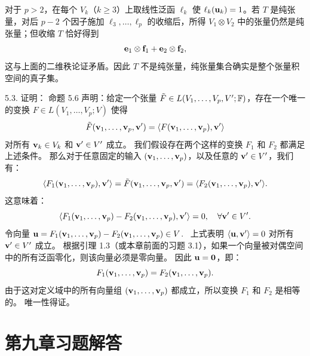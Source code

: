 \begin{exer}
对于 $p>2$，在每个 $V_k$（$k\ge3$）上取线性泛函 $\ell_k$ 使 $\ell_k(\mathbf{u}_k)=1$。若 $T$ 是纯张量，对后 $p-2$ 个因子施加 $\ell_3,\dots,\ell_p$ 的收缩后，所得 $V_1\otimes V_2$ 中的张量仍然是纯张量；但收缩 $T$ 恰好得到
$$\mathbf{e}_1\otimes\mathbf{f}_1+\mathbf{e}_2\otimes\mathbf{f}_2,$$
这与上面的二维秩论证矛盾。因此 $T$ 不是纯张量，纯张量集合确实是整个张量积空间的真子集。

5.3. 证明：
命题 5.6 声明：给定一个张量 $\tilde{F} \in L(V_1, \dots, V_p, V'; \mathbb{F})$，存在一个唯一的变换 $F \in L(V_1, \dots, V_p; V)$ 使得
$$ \tilde{F}(\mathbf{v}_1, \dots, \mathbf{v}_p, \mathbf{v}') = \langle F(\mathbf{v}_1, \dots, \mathbf{v}_p), \mathbf{v}' \rangle $$
对所有 $\mathbf{v}_k \in V_k$ 和 $\mathbf{v}' \in V'$ 成立。
我们假设存在两个这样的变换 $F_1$ 和 $F_2$ 都满足上述条件。
那么对于任意固定的输入 $(\mathbf{v}_1, \dots, \mathbf{v}_p)$，以及任意的 $\mathbf{v}' \in V'$，我们有：
$$ \langle F_1(\mathbf{v}_1, \dots, \mathbf{v}_p), \mathbf{v}' \rangle = \tilde{F}(\mathbf{v}_1, \dots, \mathbf{v}_p, \mathbf{v}') = \langle F_2(\mathbf{v}_1, \dots, \mathbf{v}_p), \mathbf{v}' \rangle. $$
这意味着：
$$ \langle F_1(\mathbf{v}_1, \dots, \mathbf{v}_p) - F_2(\mathbf{v}_1, \dots, \mathbf{v}_p), \mathbf{v}' \rangle = 0, \quad \forall \mathbf{v}' \in V'. $$
令向量 $\mathbf{u} = F_1(\mathbf{v}_1, \dots, \mathbf{v}_p) - F_2(\mathbf{v}_1, \dots, \mathbf{v}_p) \in V$.~
上式表明 $\langle \mathbf{u}, \mathbf{v}' \rangle = 0$ 对所有 $\mathbf{v}' \in V'$ 成立。
根据引理 1.3（或本章前面的习题 3.1），如果一个向量被对偶空间中的所有泛函零化，则该向量必须是零向量。
因此 $\mathbf{u} = \mathbf{0}$，即：
$$ F_1(\mathbf{v}_1, \dots, \mathbf{v}_p) = F_2(\mathbf{v}_1, \dots, \mathbf{v}_p). $$
由于这对定义域中的所有向量组 $(\mathbf{v}_1, \dots, \mathbf{v}_p)$ 都成立，所以变换 $F_1$ 和 $F_2$ 是相等的。
唯一性得证。






\vspace{5ex}

\end{exer}








\section*{第九章习题解答}

